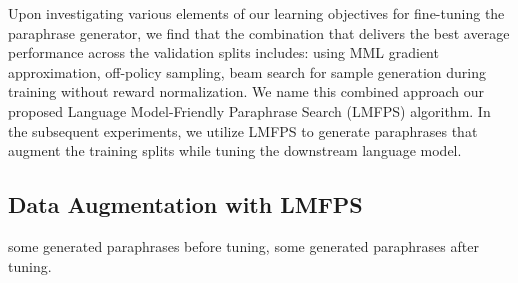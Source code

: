 \documentclass[11pt]{article}
\begin{document}
Upon investigating various elements of our learning objectives for fine-tuning the paraphrase generator, we find that the combination that delivers the best average performance across the validation splits includes: using MML gradient approximation, off-policy sampling, beam search for sample generation during training without reward normalization. We name this combined approach our proposed Language Model-Friendly Paraphrase Search (LMFPS) algorithm. In the subsequent experiments, we utilize LMFPS to generate paraphrases that augment the training splits while tuning the downstream language model.

\subsection{Data Augmentation with LMFPS}
some generated paraphrases before tuning, some generated paraphrases after tuning.
\end{document}
